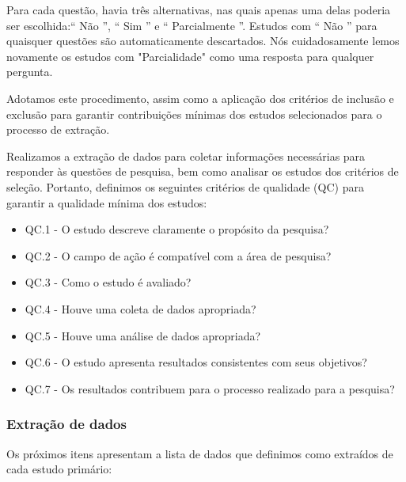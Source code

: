 Para cada questão, havia três alternativas, nas quais apenas uma delas poderia ser escolhida:`` Não '', `` Sim '' e `` Parcialmente ''. Estudos com `` Não '' para quaisquer questões são automaticamente descartados. Nós cuidadosamente lemos novamente os estudos com "Parcialidade" como uma resposta para qualquer pergunta.

Adotamos este procedimento, assim como a aplicação dos critérios de inclusão e exclusão para garantir contribuições mínimas dos estudos selecionados para o processo de extração.

Realizamos a extração de dados para coletar informações necessárias para responder às questões de pesquisa, bem como analisar os estudos dos critérios de seleção. Portanto, definimos os seguintes critérios de qualidade (QC) para garantir a qualidade mínima dos estudos:

\begin{itemize}
	\item QC.1 - O estudo descreve claramente o propósito da pesquisa?
	\item QC.2 - O campo de ação é compatível com a área de pesquisa?
	\item QC.3 - Como o estudo é avaliado?
	\item QC.4 - Houve uma coleta de dados apropriada?
	\item QC.5 - Houve uma análise de dados apropriada?
	\item QC.6 - O estudo apresenta resultados consistentes com seus objetivos?
	\item QC.7 - Os resultados contribuem para o processo realizado para a pesquisa?
\end{itemize}



\subsubsection{Extração de dados}

Os próximos itens apresentam a lista de dados que definimos como extraídos de cada estudo primário:


